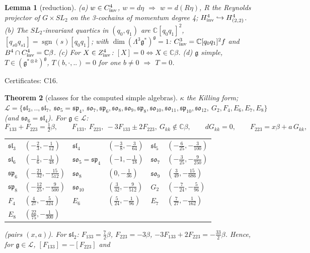 \documentclass[10pt,a4paper]{article}
\numberwithin{equation}{section}
\newtheorem{theorem}{Theorem}[section]
\newtheorem{lemma}[theorem]{Lemma}
\theoremstyle{definition}
\theoremstyle{remark}
\newcommand{\sgn}{\operatorname{sgn}}
\newcommand{\g}{\mathfrak g}
\newcommand{\fsl}{\mathfrak{sl}}
\newcommand{\fso}{\mathfrak{so}}
\newcommand{\fsp}{\mathfrak{sp}}
\newcommand{\cert}[1]{\par\noindent\textup{Certificates: #1.}\par}
\begin{document}
\begin{lemma}[reduction]\label{lem-red}
(a) $w\in C^4_{\rm inv}$, $w=d\eta$ $\Rightarrow$ $w=d(R\eta)$, $R$ the Reynolds projector of $G\times SL_2$ on the 3-cochains of momentum degree 4; $H^4_{\rm inv}\hookrightarrow H^4_{(2,2)}$. (b) The $SL_2$-invariant quartics in $(q_0,q_1)$ are $\mathbb C[q_0q_1]^2$, $[q_{s0}q_{s1}]=\sgn(s)[q_0q_1]$; with $\dim(\Lambda^3\g^*)^\g=1$: $C^3_{\rm inv}=\mathbb C[q_0q_1]^2f$ and $B^4\cap C^4_{\rm inv}=\mathbb C\beta$. (c) For $X\in Z^4_{\rm inv}$: $[X]=0\iff X\in\mathbb C\beta$. (d) $\g$ simple, $T\in(\g^{*\otimes k})^\g$, $T(b,\cdot,..)=0$ for one $b\ne0$ $\Rightarrow$ $T=0$.
\end{lemma}
\cert{C16}

\begin{theorem}[classes for the computed simple algebras]\label{thm-simple}
$\kappa$ the Killing form; $\mathcal L=\{\fsl_3,..,\fsl_7,\ \fso_5=\fsp_4,\ \fso_7,\fsp_6,\fso_8,\fso_9,\fsp_8,\fso_{10},\fso_{11},\fsp_{10},\fso_{12},\ G_2,F_4,E_6,E_7,E_8\}$ (and $\fso_6=\fsl_4$). For $\g\in\mathcal L$:
\begin{equation}
F_{133}+F_{223}=\tfrac12\beta,\qquad F_{133},\ F_{223},\ -3F_{133}\pm2F_{223},\ G_{kk}\notin\mathbb C\beta,\qquad dG_{kk}=0,\qquad F_{223}=x\beta+a\,G_{kk},
\end{equation}
\begin{center}
\begin{tabular}{@{}l@{\quad}l@{\qquad}l@{\quad}l@{\qquad}l@{\quad}l@{}}
$\fsl_3$ & $(-\frac23,-\frac1{12})$ & $\fsl_4$ & $(-\frac38,-\frac3{64})$ & $\fsl_5$ & $(-\frac6{25},-\frac3{100})$\\
$\fsl_6$ & $(-\frac16,-\frac1{48})$ & $\fso_5=\fsp_4$ & $(-1,-\frac1{18})$ & $\fso_7$ & $(-\frac3{25},-\frac9{250})$\\
$\fsp_6$ & $(-\frac{21}{32},-\frac{15}{512})$ & $\fso_8$ & $(0,-\frac1{36})$ & $\fso_9$ & $(\frac3{49},-\frac{15}{686})$\\
$\fsp_8$ & $(-\frac{12}{25},-\frac9{500})$ & $\fso_{10}$ & $(\frac3{32},-\frac9{512})$ & $G_2$ & $(-\frac7{24},-\frac5{96})$\\
$F_4$ & $(\frac4{27},-\frac5{324})$ & $E_6$ & $(\frac5{24},-\frac1{96})$ & $E_7$ & $(\frac7{27},-\frac1{162})$\\
$E_8$ & $(\frac{22}{75},-\frac1{300})$ & & & &
\end{tabular}
\end{center}
(pairs $(x,a)$). For $\fsl_2$: $F_{133}=\frac72\beta$, $F_{223}=-3\beta$, $-3F_{133}+2F_{223}=-\frac{33}2\beta$. Hence, for $\g\in\mathcal L$, $[F_{133}]=-[F_{223}]$ and

\end{theorem}
\end{document}
